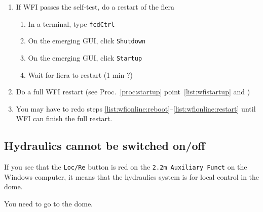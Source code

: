\documentclass[11pt,fleqn,a4paper]{book}
\begin{document}
\begin{enumerate}
\begin{enumerate}
			()
		\item Switch it off
                \item Wait for 30 seconds.\\
                      (On a 2nd or 3rd attempt, you may try to unplug/replug the electronics boards if you dare.)
		\item Switch it on.
	\end{enumerate}
  \item  If WFI passes the self-test, do a restart of the \gls{fiera} 
        \begin{enumerate}
		\item In a terminal, type \texttt{fcdCtrl}
                \item On the emerging GUI, click \texttt{Shutdown}
                \item On the emerging GUI, click \texttt{Startup}
		\item Wait for \gls{fiera} to restart (1 min ?)
        \end{enumerate}
  \item\label{list:wfionline:restart} Do a full WFI restart (see Proc.~\ref{proc:startup} point~\ref{list:wfistartup} and )
  \item You may have to redo steps \ref{list:wfionline:reboot}--\ref{list:wfionline:restart} until WFI can finish the full restart.
\end{enumerate}


\subsection{Hydraulics cannot be switched on/off}
\label{sec:hydr-loc}
If you see that the \texttt{Loc/Re} button is red on the \texttt{2.2m Auxiliary Funct} on the Windows computer, it means that the hydraulics system is for local control in the dome.

You need to go to the dome.
\end{document}
